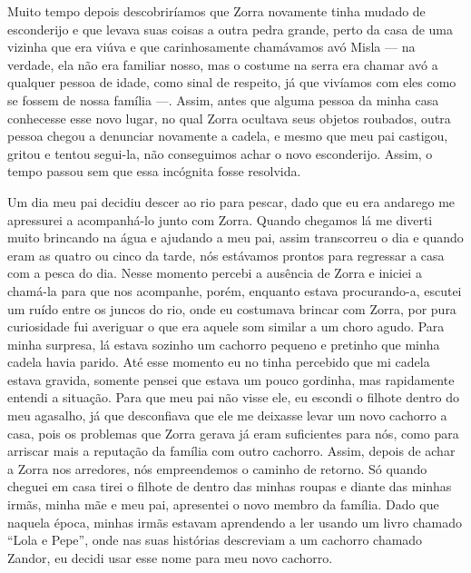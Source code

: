 Muito tempo depois descobriríamos que Zorra novamente tinha mudado de esconderijo e que levava suas coisas a outra pedra grande, perto da casa de uma vizinha que era viúva e que carinhosamente chamávamos avó Misla --- na verdade, ela não era familiar nosso, mas o costume na serra era chamar avó a qualquer pessoa de idade, como sinal de respeito, já que vivíamos com eles como se fossem de nossa família ---.
Assim, antes que alguma pessoa da minha casa conhecesse esse novo lugar, no qual Zorra ocultava seus objetos roubados, outra pessoa chegou a denunciar novamente a cadela, e mesmo que meu pai castigou, gritou e tentou segui-la, não conseguimos achar o novo esconderijo. Assim, o tempo passou sem que essa incógnita fosse resolvida. 

Um dia meu pai decidiu descer ao rio para pescar, dado que eu era andarego me apressurei a acompanhá-lo junto com Zorra. 
Quando chegamos lá me diverti muito brincando na água e ajudando a meu pai, assim transcorreu o dia e quando eram as quatro ou cinco da tarde, nós estávamos prontos para regressar a casa com a pesca do dia.
Nesse momento percebi a ausência de Zorra e iniciei a chamá-la para que nos acompanhe,
porém, enquanto estava procurando-a, escutei um ruído entre os juncos do rio, onde eu costumava brincar com Zorra, por pura curiosidade fui averiguar o que era aquele som similar a um choro agudo. Para minha surpresa, lá estava sozinho um cachorro pequeno e pretinho que minha cadela havia parido.  
Até esse momento eu no tinha percebido que mi cadela estava gravida, somente pensei que estava um pouco gordinha,
mas rapidamente entendi a situação.
Para que meu pai não visse ele, eu escondi o filhote dentro do meu agasalho, já que desconfiava que ele me deixasse levar um novo cachorro a casa, pois os problemas que Zorra gerava já eram suficientes para nós, como para arriscar mais a reputação da família com outro cachorro.
Assim, depois de achar a Zorra nos arredores, nós empreendemos o caminho de retorno.
Só quando cheguei em casa tirei o filhote de dentro das minhas roupas e diante das minhas irmãs, minha mãe e meu pai, apresentei o novo membro da família. Dado que naquela época, minhas irmãs estavam aprendendo a ler usando um livro chamado ``Lola e Pepe'', onde nas suas histórias descreviam a um cachorro chamado Zandor, eu decidi usar esse nome para meu novo cachorro. 

